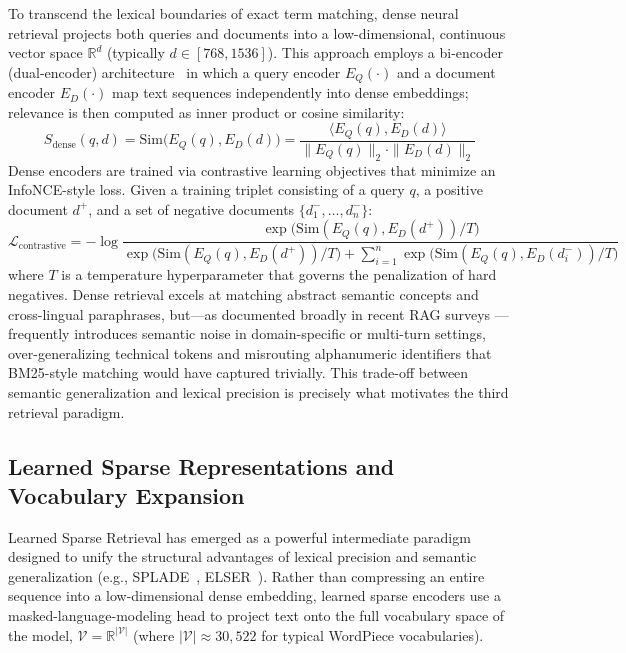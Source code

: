 To transcend the lexical boundaries of exact term matching, dense neural retrieval projects both queries and documents into a low-dimensional, continuous vector space $\mathbb{R}^d$ (typically $d \in [768, 1536]$). This approach employs a bi-encoder (dual-encoder) architecture~\citep{karpukhin2020dense} in which a query encoder $E_Q(\cdot)$ and a document encoder $E_D(\cdot)$ map text sequences independently into dense embeddings; relevance is then computed as inner product or cosine similarity:
\begin{equation}
S_{\text{dense}}(q,d) = \text{Sim}\big(E_Q(q), E_D(d)\big) = \frac{\langle E_Q(q), E_D(d)\rangle}{\|E_Q(q)\|_2 \cdot \|E_D(d)\|_2}
\end{equation}
Dense encoders are trained via contrastive learning objectives that minimize an InfoNCE-style loss. Given a training triplet consisting of a query $q$, a positive document $d^+$, and a set of negative documents $\{d_1^-, \dots, d_n^-\}$:
\begin{equation}
\mathcal{L}_{\text{contrastive}} = -\log \frac{\exp\big(\text{Sim}(E_Q(q), E_D(d^+))/T\big)}{\exp\big(\text{Sim}(E_Q(q), E_D(d^+))/T\big) + \sum_{i=1}^{n} \exp\big(\text{Sim}(E_Q(q), E_D(d_i^-))/T\big)}
\end{equation}
where $T$ is a temperature hyperparameter that governs the penalization of hard negatives. Dense retrieval excels at matching abstract semantic concepts and cross-lingual paraphrases, but---as documented broadly in recent RAG surveys \citep{gao2024retrievalaugmented}---frequently introduces semantic noise in domain-specific or multi-turn settings, over-generalizing technical tokens and misrouting alphanumeric identifiers that BM25-style matching would have captured trivially. This trade-off between semantic generalization and lexical precision is precisely what motivates the third retrieval paradigm.

\subsection{Learned Sparse Representations and Vocabulary Expansion}

Learned Sparse Retrieval has emerged as a powerful intermediate paradigm designed to unify the structural advantages of lexical precision and semantic generalization (e.g., SPLADE~\citep{formal2021splade}, ELSER~\citep{elastic2024elser}). Rather than compressing an entire sequence into a low-dimensional dense embedding, learned sparse encoders use a masked-language-modeling head to project text onto the full vocabulary space of the model, $\mathcal{V} = \mathbb{R}^{|\mathcal{V}|}$ (where $|\mathcal{V}| \approx 30{,}522$ for typical WordPiece vocabularies).

